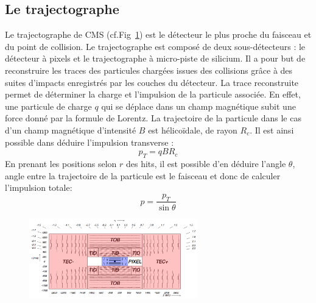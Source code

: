 \subsection{Le trajectographe}
Le trajectographe de CMS (cf.Fig~\ref{trajectographe}) est le détecteur le plus proche du faisceau et du point de collision. Le trajectographe est composé de deux sous-détecteurs : le détecteur à pixels et le trajectographe à micro-piste de silicium. Il a pour but de reconstruire les traces des particules chargées issues des collisions grâce à des suites d'impacts enregistrés par les couches du détecteur. La trace reconstruite permet de déterminer la charge et l'impulsion de la particule associée. En effet, une particule de charge $q$ qui se déplace dans un champ magnétique subit une force donné par la formule de Lorentz. La trajectoire de la particule dans le cas d'un champ magnétique d'intensité $B$ est hélicoïdale, de rayon $R_{c}$. Il est ainsi possible dans déduire l'impulsion transverse :
\begin{equation}
p_{T}=qBR_{c}
\end{equation}
En prenant les positions selon $r$ des hits, il est possible d'en déduire l'angle $\theta$, angle entre la trajectoire de la particule est le faisceau et donc de calculer l'impulsion totale:
\begin{equation}
p=\frac{p_{T}}{\sin\theta}
\end{equation}
\begin{figure}[ht!]
	\centering
	\includegraphics[width=0.65\textwidth]{CMS/tracker.png}
	\label{trajectographe}
\end{figure}

